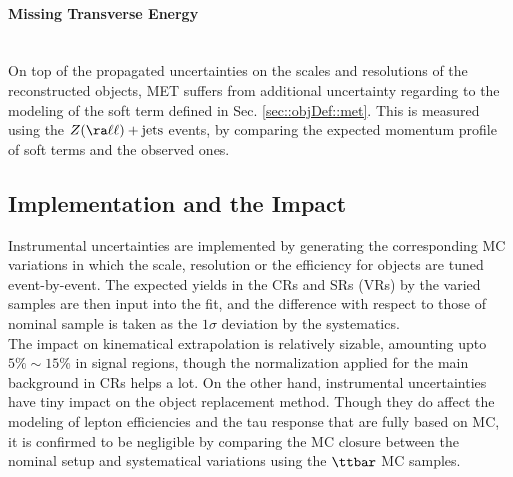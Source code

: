 

\paragraph{Missing Transverse Energy} \mbox{} \\
On top of the propagated uncertainties on the scales and resolutions of the reconstructed objects, MET suffers from additional uncertainty regarding to the modeling of the soft term defined in Sec. \ref{sec::objDef::met}.
This is measured using the $Z (\ra\ell\ell)+\mathrm{jets}$ events, by comparing the expected momentum profile of soft terms and the observed ones.  \\


\subsection{Implementation and the Impact} 
Instrumental uncertainties are implemented by generating the corresponding MC variations in which the scale, resolution or the efficiency for objects are tuned event-by-event.
The expected yields in the CRs and SRs (VRs) by the varied samples are then input into the fit, and the difference with respect to those of nominal sample is taken as the $1\sigma$ deviation by the systematics. \\

The impact on kinematical extrapolation is relatively sizable, amounting upto $5\% \sim 15\%$ in signal regions, though the normalization applied for the main background in CRs helps a lot.
On the other hand, instrumental uncertainties have tiny impact on the object replacement method. Though they do affect the modeling of lepton efficiencies and the tau response that are fully based on MC, it is confirmed to be negligible by comparing the MC closure between the nominal setup and systematical variations using the $\ttbar$ MC samples.  \\


